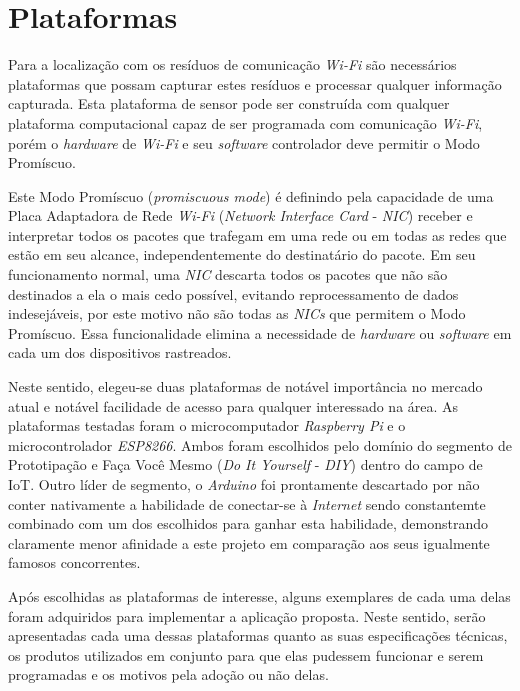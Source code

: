 \chapter{Plataformas}
\label{chap:Plataformas}

Para a localização com os resíduos de comunicação \emph{Wi-Fi} são necessários
plataformas que possam capturar estes resíduos e processar qualquer informação
capturada. Esta plataforma de sensor pode ser construída com
qualquer plataforma computacional capaz de ser programada com comunicação
\emph{Wi-Fi}, porém o \emph{hardware} de \emph{Wi-Fi} e seu \emph{software}
controlador deve permitir o Modo Promíscuo.

Este Modo Promíscuo (\emph{promiscuous mode}) é definindo pela capacidade de uma
Placa Adaptadora de Rede \emph{Wi-Fi} (\emph{Network Interface Card} -
\emph{NIC}) receber e interpretar todos os pacotes que trafegam em uma rede ou
em todas as redes que estão em seu alcance, independentemente do destinatário do
pacote. Em seu funcionamento normal, uma \emph{NIC} descarta todos os pacotes que
não são destinados a ela o mais cedo possível, evitando reprocessamento de
dados indesejáveis, por este motivo não são todas as \emph{NICs} que permitem o
Modo Promíscuo. Essa funcionalidade elimina a necessidade de \emph{hardware} ou
\emph{software} em cada um dos dispositivos rastreados.

Neste sentido, elegeu-se duas plataformas de notável importância no mercado atual
e notável facilidade de acesso para qualquer interessado na área. As plataformas
testadas foram o microcomputador \emph{Raspberry Pi} e o microcontrolador
\emph{ESP8266}. Ambos  foram escolhidos pelo domínio do segmento de Prototipação
e Faça Você Mesmo  (\emph{Do It Yourself} - \emph{DIY}) dentro do campo de IoT.
Outro líder de segmento, o \emph{Arduino}  foi prontamente descartado por não
conter nativamente a habilidade de conectar-se à \emph{Internet} sendo
constantemte combinado com um dos escolhidos para ganhar esta habilidade,
demonstrando claramente menor afinidade a este projeto em comparação aos seus
igualmente famosos concorrentes.

Após escolhidas as plataformas de interesse, alguns exemplares de cada uma delas
foram adquiridos para implementar a aplicação proposta. Neste sentido, serão
apresentadas cada uma dessas plataformas quanto as suas especificações técnicas,
os produtos utilizados em conjunto para que elas pudessem funcionar e serem
programadas e os motivos pela adoção ou não delas.
